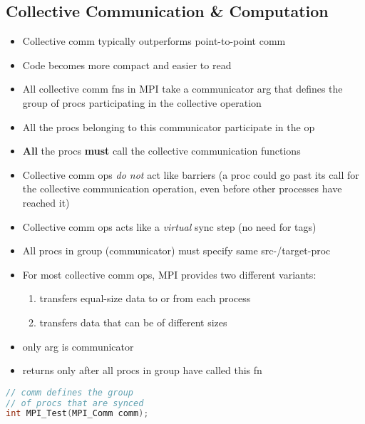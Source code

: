 \subsection*{Collective Communication \& Computation}
\begin{itemize}
\item Collective comm typically outperforms point-to-point comm
\item Code becomes more compact and easier to read
\item All collective comm fns in MPI take a communicator arg that defines the group of procs participating in the collective operation
\item All the procs belonging to this communicator participate in the op
\item \textbf{All} the procs \textbf{must} call the collective communication functions
\item Collective comm ops \emph{do not} act like barriers (a proc could go past its call for the collective communication operation, even before other processes have reached it)
\item Collective comm ops acts like a \emph{virtual} sync step (no need for tags)
\item All procs in group (communicator) must specify same src-/target-proc
\item For most collective comm ops, MPI provides two different variants:
  \begin{enumerate}
  \item transfers equal-size data to or from each process
  \item transfers data that can be of different sizes
  \end{enumerate}
\end{itemize}

\begin{minipage}{0.5\linewidth}
  \flushleft
  \begin{itemize}
  \item only arg is communicator
  \item returns only after all procs in group have called this fn
  \end{itemize}
\end{minipage}
\begin{minipage}{0.5\linewidth}
\begin{lstlisting}[language=c,xleftmargin=1pt]
// comm defines the group
// of procs that are synced
int MPI_Test(MPI_Comm comm);
\end{lstlisting}
\end{minipage}

